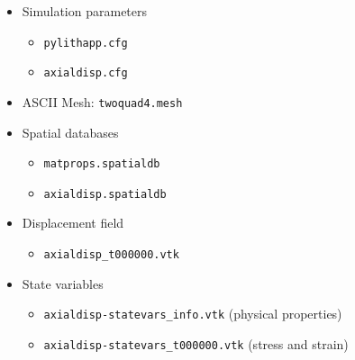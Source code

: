 \documentclass[pdftex,cig,slideColor]{pp4slides}
\begin{document}
  \begin{minipage}[t]{4in}
    {}
    \begin{itemize}
    \item Simulation parameters
      \begin{itemize}
      \item {\tt pylithapp.cfg}
      \item {\tt axialdisp.cfg}
      \end{itemize}
    \item ASCII Mesh: {\tt twoquad4.mesh}
    \item Spatial databases
      \begin{itemize}
      \item {\tt matprops.spatialdb}
      \item {\tt axialdisp.spatialdb}
      \end{itemize}
    \end{itemize}
  \end{minipage}
  \hfill
  \begin{minipage}[t]{4.75in}
    {}
    \begin{itemize}
   \item Displacement field
      \begin{itemize}
      \item {\tt axialdisp\_t000000.vtk}
      \end{itemize}
    \item State variables
      \begin{itemize}
      \item {\tt axialdisp-statevars\_info.vtk} (physical properties)
      \item {\tt axialdisp-statevars\_t000000.vtk} (stress and strain)
      \end{itemize}
    \end{itemize}
  \end{minipage}   

 
%


 \summary{}
\end{document}

